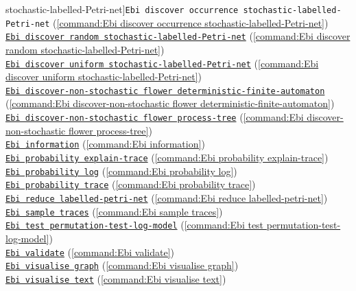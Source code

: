 {stochastic-labelled-Petri-net]{\texttt{Ebi discover occurrence stochastic-labelled-Petri-net}} (\cref{command:Ebi discover occurrence stochastic-labelled-Petri-net})\\\null\qquad\hyperref[command:Ebi discover random stochastic-labelled-Petri-net]{\texttt{Ebi discover random stochastic-labelled-Petri-net}} (\cref{command:Ebi discover random stochastic-labelled-Petri-net})\\\null\qquad\hyperref[command:Ebi discover uniform stochastic-labelled-Petri-net]{\texttt{Ebi discover uniform stochastic-labelled-Petri-net}} (\cref{command:Ebi discover uniform stochastic-labelled-Petri-net})\\\null\qquad\hyperref[command:Ebi discover-non-stochastic flower deterministic-finite-automaton]{\texttt{Ebi discover-non-stochastic flower deterministic-finite-automaton}} (\cref{command:Ebi discover-non-stochastic flower deterministic-finite-automaton})\\\null\qquad\hyperref[command:Ebi discover-non-stochastic flower process-tree]{\texttt{Ebi discover-non-stochastic flower process-tree}} (\cref{command:Ebi discover-non-stochastic flower process-tree})\\\null\qquad\hyperref[command:Ebi information]{\texttt{Ebi information}} (\cref{command:Ebi information})\\\null\qquad\hyperref[command:Ebi probability explain-trace]{\texttt{Ebi probability explain-trace}} (\cref{command:Ebi probability explain-trace})\\\null\qquad\hyperref[command:Ebi probability log]{\texttt{Ebi probability log}} (\cref{command:Ebi probability log})\\\null\qquad\hyperref[command:Ebi probability trace]{\texttt{Ebi probability trace}} (\cref{command:Ebi probability trace})\\\null\qquad\hyperref[command:Ebi reduce labelled-petri-net]{\texttt{Ebi reduce labelled-petri-net}} (\cref{command:Ebi reduce labelled-petri-net})\\\null\qquad\hyperref[command:Ebi sample traces]{\texttt{Ebi sample traces}} (\cref{command:Ebi sample traces})\\\null\qquad\hyperref[command:Ebi test permutation-test-log-model]{\texttt{Ebi test permutation-test-log-model}} (\cref{command:Ebi test permutation-test-log-model})\\\null\qquad\hyperref[command:Ebi validate]{\texttt{Ebi validate}} (\cref{command:Ebi validate})\\\null\qquad\hyperref[command:Ebi visualise graph]{\texttt{Ebi visualise graph}} (\cref{command:Ebi visualise graph})\\\null\qquad\hyperref[command:Ebi visualise text]{\texttt{Ebi visualise text}} (\cref{command:Ebi visualise text})
}
